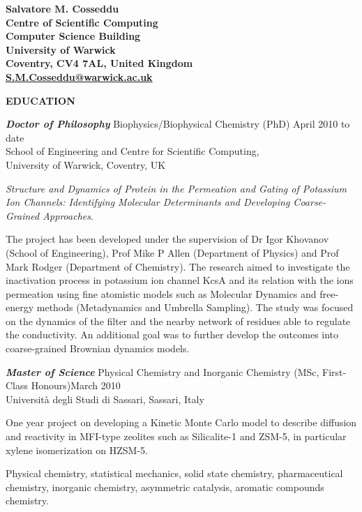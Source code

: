 \documentclass[a4paper,10pt,final]{memoir}
\newcommand{\Sep}{\vspace{1.5em}}
\newcommand{\SmallSep}{\vspace{0.5em}}
\newcommand{\CVSection}[1]
	{\Large\textbf{#1}\par
	\SmallSep\normalsize\normalfont}
\newcommand{\CVItem}[2]
	{\textit{\textbf{\color{RoyalBlue} #1}} #2}
\begin{document}
\Huge\bfseries {\color{RoyalBlue} Salvatore M. Cosseddu} \\
\small
Centre of Scientific Computing \\
Computer Science Building \\
University of Warwick \\
Coventry, CV4 7AL, United Kingdom \\
\url{S.M.Cosseddu@warwick.ac.uk}
\normalsize\normalfont
\SmallSep
\Sep

\CVSection{EDUCATION}
\CVItem{ Doctor of Philosophy}{Biophysics/Biophysical Chemistry (PhD) \hfill April 2010 to date} \\
School of Engineering and Centre for Scientific Computing, \\
University of Warwick, Coventry, UK %
\begin{description} [style=multiline,leftmargin=3cm,font=\normalfont] \itemsep -2pt
\item [Thesis:] \textit{Structure and Dynamics of Protein in the Permeation and Gating of
  Potassium Ion Channels: Identifying Molecular Determinants and Developing Coarse-Grained
  Approaches}.
\item [Research description:] The project has been developed under the supervision of Dr
  Igor Khovanov (School of Engineering), Prof Mike P Allen (Department of Physics) and
  Prof Mark Rodger (Department of Chemistry). The research aimed to investigate the
  inactivation process in potassium ion channel KcsA and its relation with the ions
  permeation using fine atomistic models such as Molecular Dynamics and free-energy
  methods (Metadynamics and Umbrella Sampling). The study was focused on the dynamics of
  the filter and the nearby network of residues able to regulate the conductivity. An
  additional goal was to further develop the outcomes into coarse-grained Brownian dynamics
  models. 
\end{description}
\SmallSep

\CVItem{Master of Science}{Physical Chemistry and Inorganic Chemistry (MSc, First-Class Honours)\hfill March 2010}\\
Universit\`a degli Studi di Sassari, Sassari, Italy %
\begin{description} [style=multiline,leftmargin=3cm,font=\normalfont] \itemsep -2pt
\item [Thesis:] One year project on developing a Kinetic Monte Carlo model to describe
  diffusion and reactivity in MFI-type zeolites such as Silicalite-1 and ZSM-5, in
  particular xylene
  isomerization on HZSM-5.
\item[Main subjects:] Physical chemistry, statistical mechanics, solid state chemistry,
  pharmaceutical chemistry, inorganic chemistry, asymmetric catalysis, aromatic compounds
  chemistry. 
\end{description}
\SmallSep
 
\end{document}
